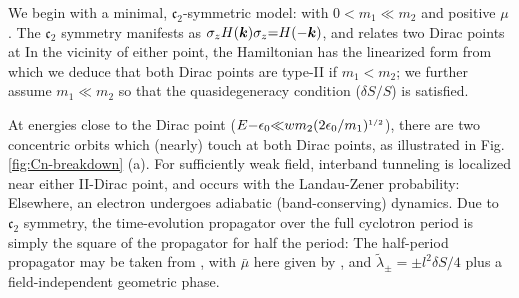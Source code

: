 \documentclass[aps, prb, showpacs, twocolumn, notitlepage, superscriptaddress]{revtex4-1}
\begin{document}

We begin with a minimal, $\mathfrak{c}_2$-symmetric model:
with $0{<}m_1{\ll}m_2$ and positive $\mu$.  The $\mathfrak{c}_2$ symmetry manifests as $\sigma_z H(\boldsymbol{k})\sigma_z{=}H({-}\boldsymbol{k})$, and relates 
two Dirac points at
In the vicinity of either point, the  Hamiltonian has the linearized form 
from which we deduce that both Dirac points are  type-II if $m_1{<}m_2$; we further assume $m_1{\ll}m_2$ so that the quasidegeneracy condition ($\delta S/S$) is satisfied. 







At energies close to the Dirac point ($E{-}\epsilon_0 {\ll} wm_2(2\epsilon_0/m_1)^{\scriptscriptstyle{1/2}}$), there are two concentric orbits which (nearly) touch at both Dirac points, as illustrated in Fig. \ref{fig:Cn-breakdown} (a). For sufficiently weak field, interband tunneling is localized near either II-Dirac point, and occurs with the Landau-Zener probability:
Elsewhere, an electron undergoes adiabatic (band-conserving) dynamics. Due to $\mathfrak{c}_2$ symmetry, the time-evolution propagator over the full cyclotron period is simply the square of the propagator for half the period: 
The half-period propagator may be taken from , with  $\bar{\mu}$ here given by , and  $\tilde{\lambda}_{\pm}{=}{\pm}l^2\delta S/4$ plus a field-independent geometric phase.
 
\end{document}

